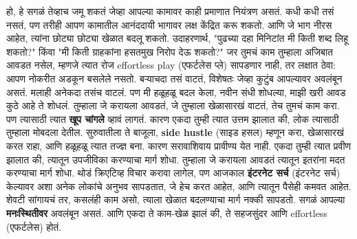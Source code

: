 हो, हे सगळं तेव्हाच जमू शकतं जेव्हा आपल्या कामावर काही प्रमाणात नियंत्रण असतं. कधी कधी तसं नसतं,
 पण तरीही आपण कामातील आनंददायी भागावर लक्ष केंद्रित करू शकतो. आणि जे भाग नीरस आहेत, त्यांना छोट्या छोट्या खेळात बदलू शकतो. उदाहरणार्थ, "पुढच्या दहा मिनिटांत मी किती शब्द लिहू शकतो?" किंवा "मी किती ग्राहकांना हसतमुख निरोप देऊ शकतो?"
जर तुमचं काम तुम्हाला अजिबात आवडत नसेल,  म्हणजे त्यात रोज effortless play (एफर्टलेस प्ले) सापडणार नाही,  तर लक्षात ठेवा: आपण नोकरीत अडकून बसलेले नसतो. बऱ्याचदा तसं वाटतं, विशेषतः जेव्हा कुटुंब आपल्यावर अवलंबून असतं. मलाही अनेकदा तसंच वाटलं. पण मी हळूहळू बदल केला,  नवीन संधी शोधल्या,
 माझी खरी आवड कुठे आहे ते शोधलं.
तुम्हाला जे करायला आवडतं, जे तुम्हाला खेळासारखं वाटतं, तेच तुमचं काम करा. पण त्यासाठी त्यात \textbf{खूप चांगले} व्हावं लागतं. कारण एकदा तुम्ही त्यात उत्तम झालात की, लोक त्यासाठी तुम्हाला मोबदला देतील. सुरुवातीला ते बाजूला, \textbf{side hustle} (साइड हसल) म्हणून करा, खेळासारखं करत राहा, आणि हळूहळू त्यात तज्ज्ञ बना. कारण सरावाशिवाय प्रावीण्य येत नाही.
एकदा तुम्ही त्यात प्रवीण झालात की, त्यातून उपजीविका करण्याचा मार्ग शोधा. तुम्हाला जे करायला आवडतं
 त्यातून इतरांना मदत करण्याचा मार्ग शोधा. थोडं क्रिएटिव्ह विचार करावा लागेल, पण आजकाल \textbf{इंटरनेट सर्च} (इंटरनेट सर्च) केल्यावर अशा अनेक लोकांचे अनुभव सापडतात, जे हेच करत आहेत, आणि त्यातून पैसेही कमवत आहेत.
शेवटी सांगायचं तर,  कसलंही काम असो, त्याला खेळात बदलण्याचा मार्ग नक्की सापडतो. सगळं आपल्या \textbf{मनःस्थितीवर} अवलंबून असतं. आणि एकदा ते काम-खेळ झालं की, ते सहजसुंदर आणि effortless (एफर्टलेस) होतं.
